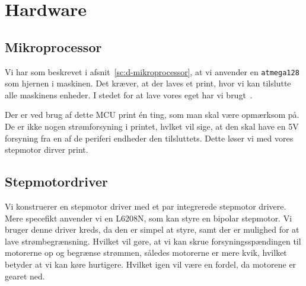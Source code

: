 \chapter[Implementering af hardware]{Hardware}


\section{Mikroprocessor}
\label{sc:i-mcu}
Vi har som beskrevet i afsnit~\vref{sc:d-mikroprocessor}, at vi
anvender en \texttt{atmega128} som hjernen i maskinen. Det kræver, at
der laves et print, hvor vi kan tilslutte alle maskinens enheder. I
stedet for at lave vores eget har vi brugt~\cite{fronter:atmega128}.

Der er ved brug af dette MCU print én ting, som man skal være
opmærksom på. De er ikke nogen strømforsyning i printet, hvlket vil
sige, at den skal have en 5V forsyning fra en af de periferi endheder
den tilsluttets. Dette løser vi med vores stepmotor dirver print.

\section{Stepmotordriver}
\label{sc:stepmotor-driver}


Vi konstruerer en stepmotor driver med et par integrerede stepmotor
drivere. Mere specefikt anvender vi en L6208N, som kan styre en
bipolar stepmotor. Vi bruger denne driver kreds, da den er simpel at
styre, samt der er mulighed for at lave strømbegrænsning. Hvilket vil
gøre, at vi kan skrue forsyningsspændingen til motorerne op og
begrænse strømmen, således motorerne er mere kvik, hvilket betyder at
vi kan køre hurtigere. Hvilket igen vil være en fordel, da motorene er
gearet ned.

